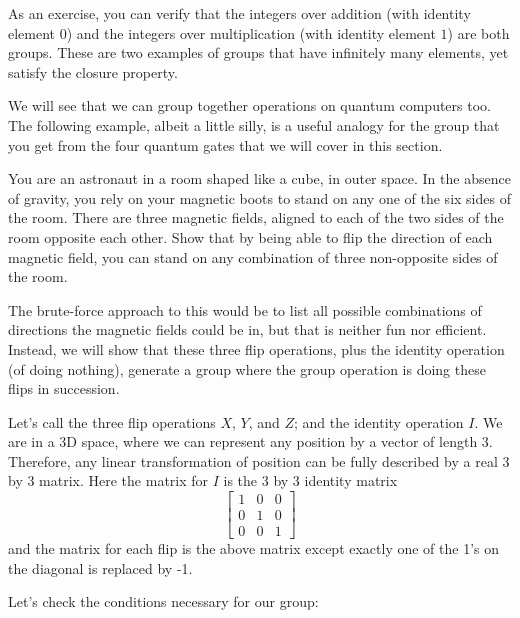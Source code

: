 \documentclass{article}
\theoremstyle{definition}
\begin{document}
As an exercise, you can verify that the integers over addition (with identity element $0$) and the integers over multiplication (with identity element $1$) are both groups.  These are two examples of groups that have infinitely many elements, yet satisfy the closure property.

We will see that we can group together operations on quantum computers too.  The following example, albeit a little silly, is a useful analogy for the group that you get from the four quantum gates that we will cover in this section.

\begin{example}
	You are an astronaut in a room shaped like a cube, in outer space.  In the absence of gravity, you rely on your magnetic boots to stand on any one of the six sides of the room.  There are three magnetic fields, aligned to each of the two sides of the room opposite each other.  Show that by being able to flip the direction of each magnetic field, you can stand on any combination of three non-opposite sides of the room.
	
	\textnormal{The brute-force approach to this would be to list all possible combinations of directions the magnetic fields could be in, but that is neither fun nor efficient.  Instead, we will show that these three flip operations, plus the identity operation (of doing nothing), generate a group where the group operation is doing these flips in succession.}
	
	\textnormal{Let's call the three flip operations $X$, $Y$, and $Z$; and the identity operation $I$.  We are in a 3D space, where we can represent any position by a vector of length 3.  Therefore, any linear transformation of position can be fully described by a real 3 by 3 matrix.  Here the matrix for $I$ is the 3 by 3 identity matrix}
	\begin{equation*}
		\begin{bmatrix}
			1 & 0 & 0\\
			0 & 1 & 0\\
			0 & 0 & 1
		\end{bmatrix}
	\end{equation*}	
	\textnormal{and the matrix for each flip is the above matrix except exactly one of the 1's on the diagonal is replaced by -1.}
	
	\textnormal{Let's check the conditions necessary for our group:}


\end{example}
\end{document}
